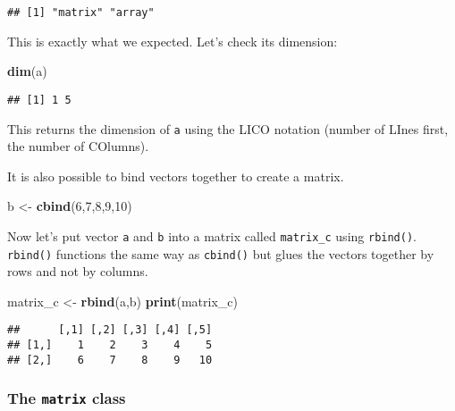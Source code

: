 \documentclass[
]{article}
\newenvironment{Shaded}{\begin{snugshade}}{\end{snugshade}}
\newcommand{\DecValTok}[1]{\textcolor[rgb]{0.00,0.00,0.81}{#1}}
\newcommand{\KeywordTok}[1]{\textcolor[rgb]{0.13,0.29,0.53}{\textbf{#1}}}
\newcommand{\NormalTok}[1]{#1}
\newcommand{\StringTok}[1]{\textcolor[rgb]{0.31,0.60,0.02}{#1}}
\begin{document}
\begin{verbatim}
## [1] "matrix" "array"
\end{verbatim}

This is exactly what we expected. Let's check its dimension:

\begin{Shaded}
\begin{Highlighting}[]
\KeywordTok{dim}\NormalTok{(a)}
\end{Highlighting}
\end{Shaded}

\begin{verbatim}
## [1] 1 5
\end{verbatim}

This returns the dimension of \texttt{a} using the LICO notation (number of LInes first, the number of COlumns).

It is also possible to bind vectors together to create a matrix.

\begin{Shaded}
\begin{Highlighting}[]
\NormalTok{b \textless{}{-}}\StringTok{ }\KeywordTok{cbind}\NormalTok{(}\DecValTok{6}\NormalTok{,}\DecValTok{7}\NormalTok{,}\DecValTok{8}\NormalTok{,}\DecValTok{9}\NormalTok{,}\DecValTok{10}\NormalTok{)}
\end{Highlighting}
\end{Shaded}

Now let's put vector \texttt{a} and \texttt{b} into a matrix called \texttt{matrix\_c} using \texttt{rbind()}.
\texttt{rbind()} functions the same way as \texttt{cbind()} but glues the vectors together by rows and not by columns.

\begin{Shaded}
\begin{Highlighting}[]
\NormalTok{matrix\_c \textless{}{-}}\StringTok{ }\KeywordTok{rbind}\NormalTok{(a,b)}
\KeywordTok{print}\NormalTok{(matrix\_c)}
\end{Highlighting}
\end{Shaded}

\begin{verbatim}
##      [,1] [,2] [,3] [,4] [,5]
## [1,]    1    2    3    4    5
## [2,]    6    7    8    9   10
\end{verbatim}

\hypertarget{the-matrix-class}{%
\subsubsection{\texorpdfstring{The \texttt{matrix} class}{The matrix class}}\label{the-matrix-class}}
\end{document}
